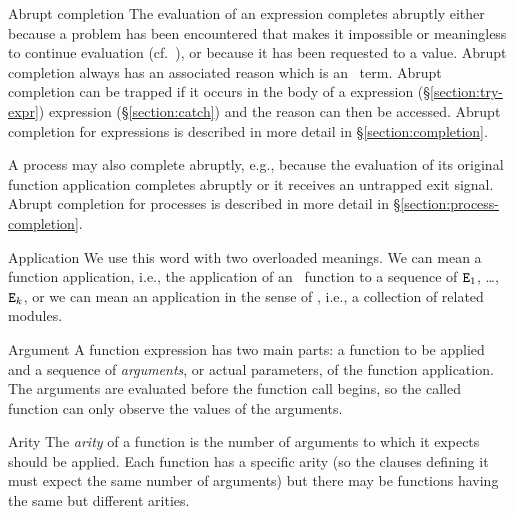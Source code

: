 \begin{Lentry}
\item[Abrupt completion]
The evaluation of an expression completes abruptly either because a
problem has been encountered that makes it impossible or meaningless
to continue evaluation (cf.\ ), or because it has been
requested to  a value.  Abrupt completion always has an
associated reason which is an
\Erlang\ term.  Abrupt completion can be trapped if it occurs in the
body of a
\ifStd{} expression (\S\ref{section:try-expr}) \else
{} expression (\S\ref{section:catch}) \fi
and the reason can then be accessed.  Abrupt completion for
expressions is described in more detail in \S\ref{section:completion}.

A process may also complete abruptly, e.g., because the evaluation of
its original function application completes abruptly or it receives an
untrapped exit signal.  Abrupt completion for processes is described
in more detail in \S\ref{section:process-completion}.

\item[Application]
We use this word with two overloaded meanings.  We can mean a function
application,
i.e., the application 
of an \Erlang\ function  to a sequence of  ${\tt{\sl E}}_1$, \ldots,
${\tt{\sl E}}_k$, or we can
mean an application in the sense of , i.e., a collection of
related modules.

\item[Argument]
A function  expression has two main parts: a function to be
applied and a sequence of \emph{arguments}, or actual parameters, of the function
application.  The arguments are evaluated before the function call begins, so
the called function can only observe the values of the arguments.

\item[Arity]
The \emph{arity} of a function is the number of arguments to which
it expects should be applied.  Each function has a specific arity (so the
clauses defining it must expect the same number of arguments) but there may be
functions having the same  but different arities.


\end{Lentry}
